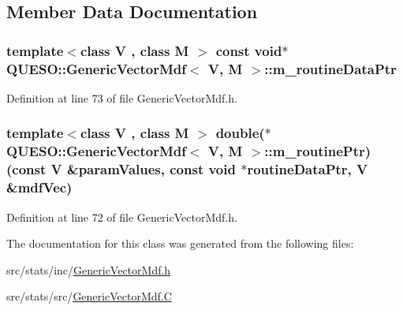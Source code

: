 \subsection{Member Data Documentation}
\hypertarget{class_q_u_e_s_o_1_1_generic_vector_mdf_a3c60ffbbf54b329b9c70344cbe8138be}{
\subsubsection[{m\-\_\-routine\-Data\-Ptr}]{\setlength{\rightskip}{0pt plus 5cm}template$<$class V , class M $>$ const void$\ast$ {\bf Q\-U\-E\-S\-O\-::\-Generic\-Vector\-Mdf}$<$ V, M $>$\-::m\-\_\-routine\-Data\-Ptr\hspace{0.3cm}{\ttfamily [protected]}}}\label{class_q_u_e_s_o_1_1_generic_vector_mdf_a3c60ffbbf54b329b9c70344cbe8138be}


Definition at line 73 of file Generic\-Vector\-Mdf.\-h.

\hypertarget{class_q_u_e_s_o_1_1_generic_vector_mdf_ae8a3da0e7389c6ba3f6448374e8792d6}{
\subsubsection[{m\-\_\-routine\-Ptr}]{\setlength{\rightskip}{0pt plus 5cm}template$<$class V , class M $>$ double($\ast$ {\bf Q\-U\-E\-S\-O\-::\-Generic\-Vector\-Mdf}$<$ V, M $>$\-::m\-\_\-routine\-Ptr)(const V \&param\-Values, const void $\ast$routine\-Data\-Ptr, V \&mdf\-Vec)\hspace{0.3cm}{\ttfamily [protected]}}}\label{class_q_u_e_s_o_1_1_generic_vector_mdf_ae8a3da0e7389c6ba3f6448374e8792d6}


Definition at line 72 of file Generic\-Vector\-Mdf.\-h.



The documentation for this class was generated from the following files\-:\begin{DoxyCompactItemize}
\item 
src/stats/inc/\hyperlink{_generic_vector_mdf_8h}{Generic\-Vector\-Mdf.\-h}\item 
src/stats/src/\hyperlink{_generic_vector_mdf_8_c}{Generic\-Vector\-Mdf.\-C}\end{DoxyCompactItemize}
